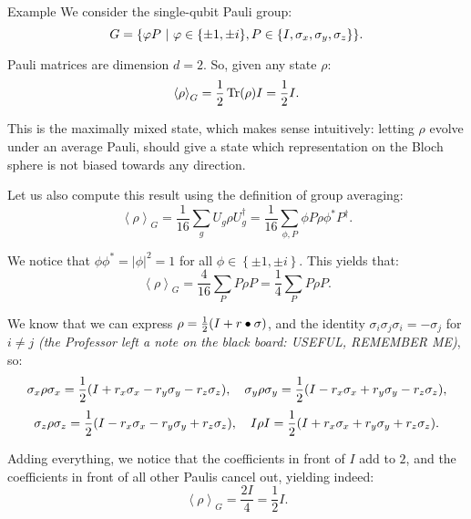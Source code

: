 \documentclass[a4paper]{article}
\begin{document}
\begin{parag}{Example}
    We consider the single-qubit Pauli group: 
    \[G = \left\{\phi P \suchthat \phi \in \left\{\pm 1, \pm i\right\}, P \in \left\{I, \sigma_x, \sigma_y, \sigma_z\right\}\right\}.\]

    Pauli matrices are dimension $d = 2$. So, given any state $\rho$: 
    \[\left\langle \rho \right\rangle_G = \frac{1}{2} \Tr\left(\rho\right) I = \frac{1}{2} I.\]

    This is the maximally mixed state, which makes sense intuitively: letting $\rho$ evolve under an average Pauli, should give a state which representation on the Bloch sphere is not biased towards any direction.

    Let us also compute this result using the definition of group averaging: 
    \[\left\langle \rho \right\rangle_G = \frac{1}{16} \sum_{g} U_g \rho U_g^{\dagger} = \frac{1}{16} \sum_{\phi, P} \phi P \rho \phi^* P^{\dagger}.\]

    We notice that $\phi \phi^* = \left|\phi\right|^2 = 1$ for all $\phi \in \left\{\pm 1, \pm i\right\}$. This yields that: 
    \[\left\langle \rho \right\rangle_G = \frac{4}{16} \sum_{P} P \rho P = \frac{1}{4} \sum_{P} P \rho P.\]
    
    We know that we  can express $\rho = \frac{1}{2}\left(I + r \dotprod \sigma\right)$, and the identity $\sigma_i \sigma_j \sigma_i = -\sigma_j$ for $i \neq j$ \textit{(the Professor left a note on the black board: USEFUL, REMEMBER ME)}, so: 
    \[\sigma_x \rho \sigma_x = \frac{1}{2}\left(I + r_x \sigma_x - r_y \sigma_y - r_z \sigma_z\right), \mathspace \sigma_y \rho \sigma_y = \frac{1}{2}\left(I - r_x \sigma_x + r_y \sigma_y - r_z \sigma_z\right),\]
    \[\sigma_z \rho \sigma_z = \frac{1}{2}\left(I - r_x \sigma_x - r_y \sigma_y + r_z \sigma_z\right), \mathspace I \rho I = \frac{1}{2}\left(I + r_x \sigma_x + r_y \sigma_y + r_z \sigma_z\right).\]

    Adding everything, we notice that the coefficients in front of $I$ add to $2$, and the coefficients in front of all other Paulis cancel out, yielding indeed: 
    \[\left\langle \rho \right\rangle_G = \frac{2I}{4} = \frac{1}{2} I.\]
\end{parag}
\end{document}
